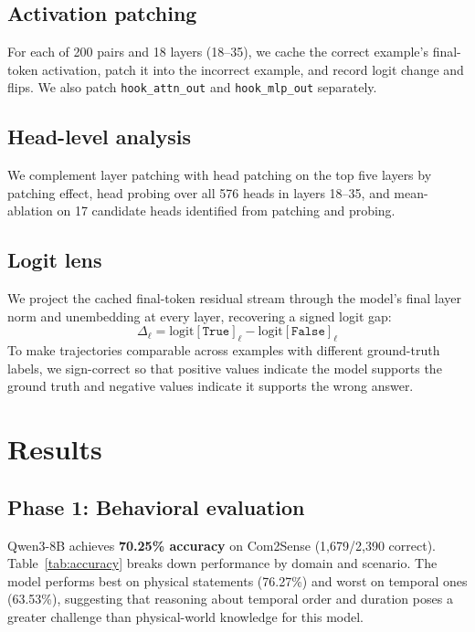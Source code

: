 \documentclass{article}
\begin{document}
\subsection{Activation patching}

For each of 200 pairs and 18 layers (18--35), we cache the correct example's final-token activation, patch it into the incorrect example, and record logit change and flips.
We also patch \texttt{hook\_attn\_out} and \texttt{hook\_mlp\_out} separately.

\subsection{Head-level analysis}

We complement layer patching with head patching on the top five layers by patching effect, head probing over all 576 heads in layers 18--35, and mean-ablation on 17 candidate heads identified from patching and probing.

\subsection{Logit lens}

We project the cached final-token residual stream through the model's final layer norm and unembedding at every layer, recovering a signed logit gap:
\[
\Delta_\ell = \text{logit}[\texttt{True}]_\ell - \text{logit}[\texttt{False}]_\ell
\]
To make trajectories comparable across examples with different ground-truth labels, we sign-correct so that positive values indicate the model supports the ground truth and negative values indicate it supports the wrong answer.

\section{Results}
\label{sec:results}

\subsection{Phase 1: Behavioral evaluation}

Qwen3-8B achieves \textbf{70.25\% accuracy} on Com2Sense (1,679/2,390 correct).
Table~\ref{tab:accuracy} breaks down performance by domain and scenario.
The model performs best on physical statements (76.27\%) and worst on temporal ones (63.53\%), suggesting that reasoning about temporal order and duration poses a greater challenge than physical-world knowledge for this model.
\end{document}
